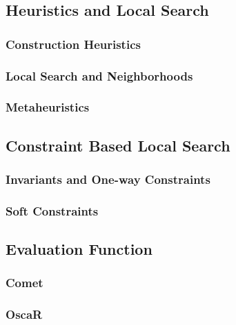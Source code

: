 \documentclass[a4paper,11pt]{article}
\begin{document}
  \subsection{Heuristics and Local Search}
    \subsubsection{Construction Heuristics}
    \subsubsection{Local Search and Neighborhoods}
    \subsubsection{Metaheuristics}
  \subsection{Constraint Based Local Search}
    \subsubsection{Invariants and One-way Constraints}
    
    \subsubsection{Soft Constraints}
    	
  \subsection{Evaluation Function}
  
    \subsubsection{Comet}
    \subsubsection{OscaR}

\end{document}
